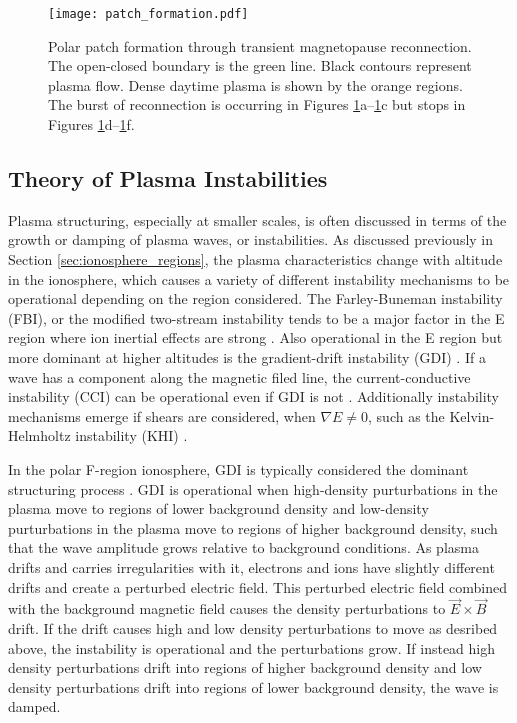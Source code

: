 \begin{figure}
	\texttt{[image: patch\_formation.pdf]}
	\caption{Polar patch formation through transient magnetopause reconnection.  The open-closed boundary is the green line.  Black contours represent plasma flow.  Dense daytime plasma is shown by the orange regions.  The burst of reconnection is occurring in Figures \ref{fig:patch_formation}a--\ref{fig:patch_formation}c but stops in Figures \ref{fig:patch_formation}d--\ref{fig:patch_formation}f.}
	\label{fig:patch_formation}
\end{figure}

\subsection{Theory of Plasma Instabilities}
\label{sec:lit_instabilities}
Plasma structuring, especially at smaller scales, is often discussed in terms of the growth or damping of plasma waves, or instabilities.  As discussed previously in Section \ref{sec:ionosphere_regions}, the plasma characteristics change with altitude in the ionosphere, which causes a variety of different instability mechanisms to be operational depending on the region considered.  The Farley-Buneman instability (FBI), or the modified two-stream instability tends to be a major factor in the E region where ion inertial effects are strong \citep{Farley1963,Buneman1963}.  Also operational in the E region but more dominant at higher altitudes is the gradient-drift instability (GDI) \citep{Simon1963,Hoh1963,Linson1970}.  If a wave has a component along the magnetic filed line, the current-conductive instability (CCI) can be operational even if GDI is not \citep{Hoh1960,Ossakow1979,Chaturvedi1981}.  Additionally instability mechanisms emerge if shears are considered, when \(\nabla E \neq 0\), such as the Kelvin-Helmholtz instability (KHI) \citep{Kintner1977,DAngelo1965}.

In the polar F-region ionosphere, GDI is typically considered the dominant structuring process \citep{Weber1984,Cerisier1985,Basu1988,Tsunoda1988}.  GDI is operational when high-density purturbations in the plasma move to regions of lower background density and low-density purturbations in the plasma move to regions of higher background density, such that the wave amplitude grows relative to background conditions.  As plasma drifts and carries irregularities with it, electrons and ions have slightly different drifts and create a perturbed electric field.  This perturbed electric field combined with the background magnetic field causes the density perturbations to \(\vec{E}\times\vec{B}\) drift.  If the drift causes high and low density perturbations to move as desribed above, the instability is operational and the perturbations grow.  If instead high density perturbations drift into regions of higher background density and low density perturbations drift into regions of lower background density, the wave is damped.

